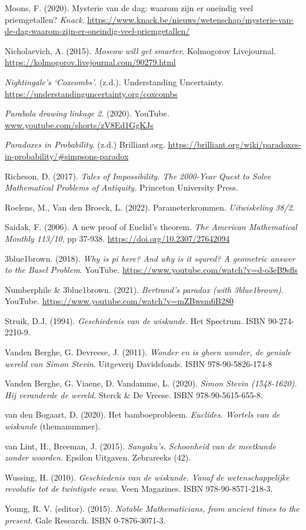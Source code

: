 \begin{bronnen}
	\item Moons, F. (2020). Mysterie van de dag: waarom zijn er oneindig veel priemgetallen? \emph{Knack}. \url{https://www.knack.be/nieuws/wetenschap/mysterie-van-de-dag-waarom-zijn-er-oneindig-veel-priemgetallen/}
	\item Nicholaevich, A. (2015). \textit{Moscow will get smarter}. Kolmogorov Livejournal. \url{https://kolmogorov.livejournal.com/90279.html}
	\item \textit{Nightingale's `Coxcombs'}. (z.d.). Understanding Uncertainty. \url{https://understandinguncertainty.org/coxcombs}
	\item \textit{Parabola drawing linkage 2}. (2020). YouTube. \url{www.youtube.com/shorts/zV8Ed1GgKJs}
	\item \textit{Paradoxes in Probability}. (z.d.) Brilliant.org.	\url{https://brilliant.org/wiki/paradoxes-in-probability/#simpsons-paradox}
	\item Richeson, D. (2017). \textit{Tales of Impossibility. The 2000-Year Quest to Solve Mathematical Problems of Antiquity.} Princeton University Press.
	\item Roelens, M., Van den Broeck, L. (2022). Parameterkrommen. \emph{Uitwiskeling 38/2}.
	\item Saidak, F. (2006). A new proof of Euclid's theorem. \emph{The American Mathematical Monthly 113/10}, pp 37-938. \url{https://doi.org/10.2307/27642094}
	
	\item 3blue1brown. (2018). \textit{Why is pi here? And why is it squred? A geometric answer to the Basel Problem}. YouTube. \url{https://www.youtube.com/watch?v=d-o3eB9sfls}
	\item Numberphile \& 3blue1brown. (2021). \textit{Bertrand's paradox (with 3blue1brown)}. YouTube.	\url{https://www.youtube.com/watch?v=mZBwsm6B280}
	\item Struik, D.J. (1994). \textit{Geschiedenis van de wiskunde}. Het Spectrum. ISBN 90-274-2210-9.
	\item Vanden Berghe, G. Devreese, J. (2011). \textit{Wonder en is gheen wonder, de geniale wereld van Simon Stevin}. Uitgeverij Davidsfonds. ISBN 978-90-5826-174-8
	\item Vanden Berghe, G. Viaene, D. Vandamme, L. (2020). \textit{Simon Stevin (1548-1620). Hij veranderde de wereld}. Sterck \& De Vreese. ISBN 978-90-5615-655-8.
	\item van den Bogaart, D. (2020). Het bamboeprobleem. \emph{Euclides. Wortels van de wiskunde} (themanummer).
	\item van Lint, H., Breeman, J. (2015). \textit{Sangaku's. Schoonheid van de meetkunde zonder woorden.} Epsilon Uitgaven. Zebrareeks (42).
	\item Wussing, H. (2010). \textit{Geschiedenis van de wiskunde. Vanaf de wetenschappelijke revolutie tot de twintigste eeuw}. Veen Magazines. ISBN 978-90-8571-218-3.
	\item Young, R. V. (editor). (2015). \textit{Notable Mathematicians, from ancient times to the present}. Gale Research. ISBN 0-7876-3071-3.
\end{bronnen}